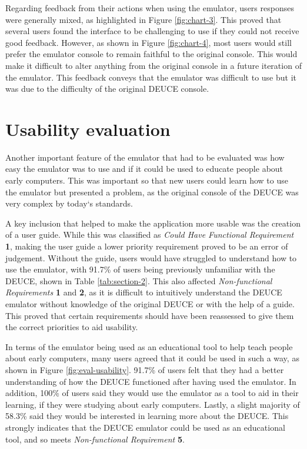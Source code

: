 \documentclass{l4proj}
\begin{document}
Regarding feedback from their actions when using the emulator, users responses were generally mixed, as highlighted in Figure \ref{fig:chart-3}. This proved that several users found the interface to be challenging to use if they  could not receive good feedback. However, as shown in Figure \ref{fig:chart-4}, most users would still prefer the emulator console to remain faithful to the original console. This would make it difficult to alter anything from the original console in a future iteration of the emulator. This feedback conveys that the emulator was difficult to use but it was due to the difficulty of the original DEUCE console. 

\section{Usability evaluation}
Another important feature of the emulator that had to be evaluated was how easy the emulator was to use and if it could be used to educate people about early computers. This was important so that new users could learn how to use the emulator but presented a problem, as the original console of the DEUCE was very complex by today`s standards. 

A key inclusion that helped to make the application more usable was the creation of a user guide. While this was classified as \textit{Could Have Functional Requirement} \textbf{1}, making the user guide a lower priority requirement proved to be an error of judgement. Without the guide, users would have struggled to understand how to use the emulator, with 91.7\% of users being previously unfamiliar with the DEUCE, shown in Table \ref{tab:section-2}. This also affected \textit{Non-functional Requirements} \textbf{1} and \textbf{2}, as it is difficult to intuitively understand the DEUCE emulator without knowledge of the original DEUCE or with the help of a guide. This proved that certain requirements should have been reassessed to give them the correct priorities to aid usability.

In terms of the emulator being used as an educational tool to help teach people about early computers, many users agreed that it could be used in such a way, as shown in Figure \ref{fig:eval-usability}. 91.7\% of users felt that they had a better understanding of how the DEUCE functioned after having used the emulator. In addition, 100\% of users said they would use the emulator as a tool to aid in their learning, if they were studying about early computers. Lastly, a slight majority of 58.3\% said they would be interested in learning more about the DEUCE. This strongly indicates that the DEUCE emulator could be used as an educational tool, and so meets \textit{Non-functional Requirement} \textbf{5}.
\end{document}
